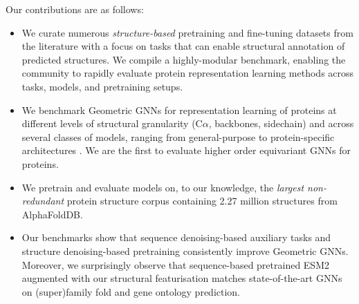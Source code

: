 Our contributions are as follows:\vspace{-5pt}
\begin{itemize}
    \item We curate numerous \emph{structure-based} pretraining and fine-tuning datasets from the literature with a focus on tasks that can enable structural annotation of predicted structures. We compile a highly-modular benchmark, enabling the community to rapidly evaluate protein representation learning methods across tasks, models, and pretraining setups. 
    \item We benchmark Geometric GNNs for representation learning of proteins at different levels of structural granularity (C$\alpha$, backbones, sidechain) and across several classes of models, ranging from general-purpose \citep{schutt2018schnet, satorras2021n} to protein-specific architectures \citep{morehead2024geometry, zhang2023protein}. 
    We are the first to evaluate higher order equivariant GNNs \citep{thomas2018tensor, batatia2022mace} for proteins.
    \item We pretrain and evaluate models on, to our knowledge, the \emph{largest non-redundant} protein structure corpus containing 2.27 million structures from AlphaFoldDB.
    \item Our benchmarks show that sequence denoising-based auxiliary tasks and structure denoising-based pretraining consistently improve Geometric GNNs.
    Moreover, we surprisingly observe that sequence-based pretrained ESM2 \citep{lin2022language} augmented with our structural featurisation matches state-of-the-art GNNs on (super)family fold and gene ontology prediction.
\end{itemize}
